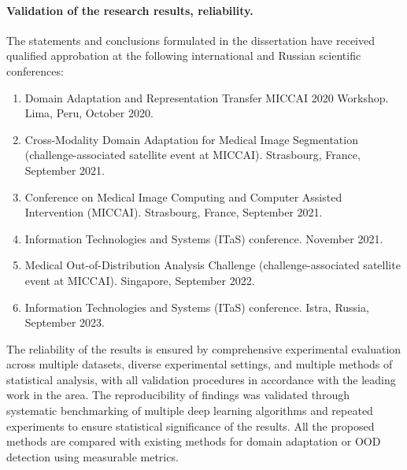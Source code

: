 \begin{enumerate}
 
\end{enumerate}


\paragraph{Validation of the research results, reliability.}

The statements and conclusions formulated in the dissertation have received qualified approbation at the following international and Russian scientific conferences:

\begin{enumerate}
	\item Domain Adaptation and Representation Transfer MICCAI 2020 Workshop. Lima, Peru, October 2020.
    \item Cross-Modality Domain Adaptation for Medical Image Segmentation (challenge-associated satellite event at MICCAI). Strasbourg, France, September 2021.
    \item Conference on Medical Image Computing and Computer Assisted Intervention (MICCAI). Strasbourg, France, September 2021.
    \item Information Technologies and Systems (ITaS) conference. November 2021.
    \item Medical Out-of-Distribution Analysis Challenge (challenge-associated satellite event at MICCAI). Singapore, September 2022.
    \item Information Technologies and Systems (ITaS) conference. Istra, Russia, September 2023.
\end{enumerate}

The reliability of the results is ensured by comprehensive experimental evaluation across multiple datasets, diverse experimental settings, and multiple methods of statistical analysis, with all validation procedures in accordance with the leading work in the area. The reproducibility of findings was validated through systematic benchmarking of multiple deep learning algorithms and repeated experiments to ensure statistical significance of the results. All the proposed methods are compared with existing methods for domain adaptation or OOD detection using measurable metrics.

